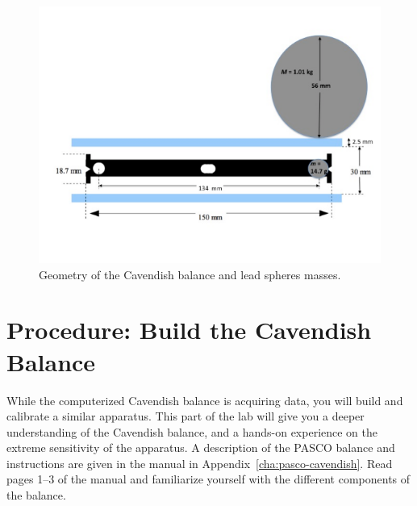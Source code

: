 \begin{figure}
	\centering
	\includegraphics[width=\textwidth]{cavendish/tel-rp2111-geometry}
	\caption{Geometry of the Cavendish balance and lead spheres masses.}\label{cav:fig:geo}
\end{figure}

\section{Procedure: Build the Cavendish Balance}

While the computerized Cavendish balance is acquiring data, you will build and calibrate
a similar apparatus. This part of the lab will give you a deeper understanding of the
Cavendish balance, and a hands-on experience on the extreme sensitivity of the
apparatus. A description of the PASCO balance and instructions are given in the manual in Appendix~\ref{cha:pasco-cavendish}.
Read pages 1--3 of the manual and familiarize yourself with the different components of
the balance.

